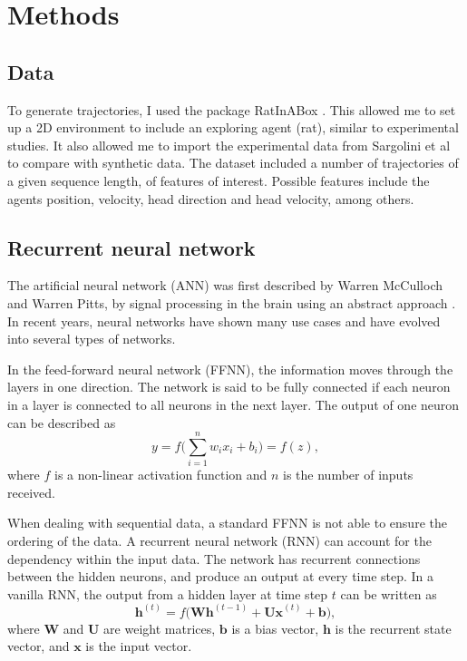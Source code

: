 \section{Methods}\label{sec:methods}
\subsection{Data}\label{sssec:data}
To generate trajectories, I used the package RatInABox \cite{george:2022:ratinabox}. This allowed me to set up a 2D environment to include an exploring agent (rat), similar to experimental studies. It also allowed me to import the experimental data from Sargolini et al \cite{sargolini:2006:conjunctive} to compare with synthetic data. The dataset included a number of trajectories of a given sequence length, of features of interest. Possible features include the agents position, velocity, head direction and head velocity, among others. 

\subsection{Recurrent neural network}\label{sssec:rnn}
The artificial neural network (ANN) was first described by Warren McCulloch and Warren Pitts, by signal processing in the brain using an abstract approach \cite{mcculloch:1943:logical}. In recent years, neural networks have shown many use cases and have evolved into several types of networks.

In the feed-forward neural network (FFNN), the information moves through the layers in one direction. The network is said to be fully connected if each neuron in a layer is connected to all neurons in the next layer. The output of one neuron can be described as 
\begin{equation}\label{eq:ffnn}
    y = f \bigg( \sum_{i=1}^{n} w_{i} x_{i} + b_{i} \bigg) = f(z),
\end{equation}
where $f$ is a non-linear activation function and $n$ is the number of inputs received.

When dealing with sequential data, a standard FFNN is not able to ensure the ordering of the data. A recurrent neural network (RNN) can account for the dependency within the input data. The network has recurrent connections between the hidden neurons, and produce an output at every time step. In a vanilla RNN, the output from a hidden layer at time step $t$ can be written as 
\begin{equation}\label{eq:vanilla_rnn}
    \mathbf{h}^{(t)} = f \bigg( \mathbf{Wh}^{(t-1)} + \mathbf{Ux}^{(t)} +  \mathbf{b} \bigg), 
\end{equation}
where $\mathbf{W}$ and $\mathbf{U}$ are weight matrices, $\mathbf{b}$ is a bias vector, $\mathbf{h}$ is the recurrent state vector, and $\mathbf{x}$ is the input vector.

